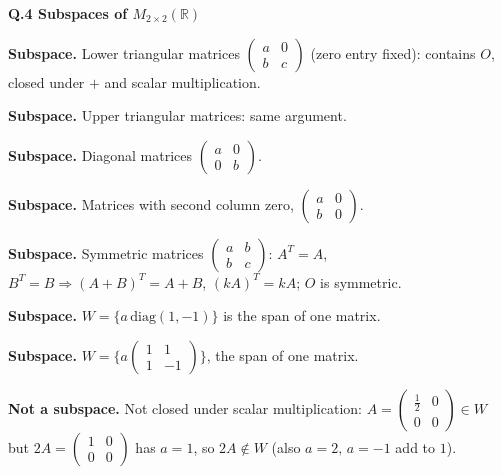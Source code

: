 \medskip\noindent\textbf{Q.4  Subspaces of $M_{2\times2}(\mathbb{R})$}\par\smallskip
\begin{description}[leftmargin=1.2cm,itemsep=2pt]
\item[1.] \textbf{Subspace.} Lower triangular matrices $\begin{pmatrix}a&0\\b&c\end{pmatrix}$ (zero entry fixed): contains $O$, closed under $+$ and scalar multiplication.
\item[2.] \textbf{Subspace.} Upper triangular matrices: same argument.
\item[3.] \textbf{Subspace.} Diagonal matrices $\begin{pmatrix}a&0\\0&b\end{pmatrix}$.
\item[4.] \textbf{Subspace.} Matrices with second column zero, $\begin{pmatrix}a&0\\b&0\end{pmatrix}$.
\item[5.] \textbf{Subspace.} Symmetric matrices $\begin{pmatrix}a&b\\b&c\end{pmatrix}$: $A^T=A$, $B^T=B\Rightarrow(A+B)^T=A+B$, $(kA)^T=kA$; $O$ is symmetric.
\item[6.] \textbf{Subspace.} $W=\{a\,\mathrm{diag}(1,-1)\}$ is the span of one matrix.
\item[7.] \textbf{Subspace.} $W=\{a\begin{pmatrix}1&1\\1&-1\end{pmatrix}\}$, the span of one matrix.
\item[8.] \textbf{Not a subspace.} Not closed under scalar multiplication: $A=\begin{pmatrix}\frac12&0\\0&0\end{pmatrix}\in W$ but $2A=\begin{pmatrix}1&0\\0&0\end{pmatrix}$ has $a=1$, so $2A\notin W$ (also $a=2,\,a=-1$ add to $1$).
\end{description}
